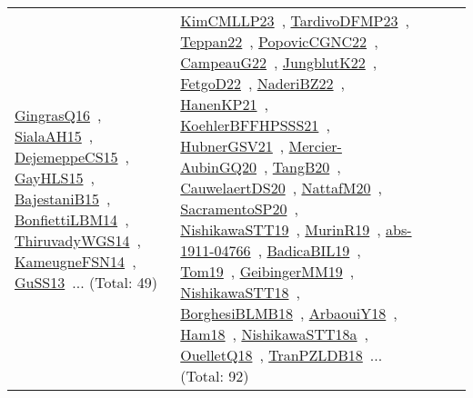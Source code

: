 {\begin{longtable}{lp{3cm}>{\raggedright\arraybackslash}p{6cm}>{\raggedright\arraybackslash}p{6cm}>{\raggedright\arraybackslash}p{8cm}}
\href{works/GingrasQ16.pdf}{GingrasQ16}~\cite{GingrasQ16}, \href{works/SialaAH15.pdf}{SialaAH15}~\cite{SialaAH15}, \href{works/DejemeppeCS15.pdf}{DejemeppeCS15}~\cite{DejemeppeCS15}, \href{works/GayHLS15.pdf}{GayHLS15}~\cite{GayHLS15}, \href{works/BajestaniB15.pdf}{BajestaniB15}~\cite{BajestaniB15}, \href{works/BonfiettiLBM14.pdf}{BonfiettiLBM14}~\cite{BonfiettiLBM14}, \href{works/ThiruvadyWGS14.pdf}{ThiruvadyWGS14}~\cite{ThiruvadyWGS14}, \href{works/KameugneFSN14.pdf}{KameugneFSN14}~\cite{KameugneFSN14}, \href{works/GuSS13.pdf}{GuSS13}~\cite{GuSS13}... (Total: 49) & \href{works/KimCMLLP23.pdf}{KimCMLLP23}~\cite{KimCMLLP23}, \href{works/TardivoDFMP23.pdf}{TardivoDFMP23}~\cite{TardivoDFMP23}, \href{works/Teppan22.pdf}{Teppan22}~\cite{Teppan22}, \href{works/PopovicCGNC22.pdf}{PopovicCGNC22}~\cite{PopovicCGNC22}, \href{works/CampeauG22.pdf}{CampeauG22}~\cite{CampeauG22}, \href{works/JungblutK22.pdf}{JungblutK22}~\cite{JungblutK22}, \href{works/FetgoD22.pdf}{FetgoD22}~\cite{FetgoD22}, \href{works/NaderiBZ22.pdf}{NaderiBZ22}~\cite{NaderiBZ22}, \href{works/HanenKP21.pdf}{HanenKP21}~\cite{HanenKP21}, \href{works/KoehlerBFFHPSSS21.pdf}{KoehlerBFFHPSSS21}~\cite{KoehlerBFFHPSSS21}, \href{works/HubnerGSV21.pdf}{HubnerGSV21}~\cite{HubnerGSV21}, \href{works/Mercier-AubinGQ20.pdf}{Mercier-AubinGQ20}~\cite{Mercier-AubinGQ20}, \href{works/TangB20.pdf}{TangB20}~\cite{TangB20}, \href{works/CauwelaertDS20.pdf}{CauwelaertDS20}~\cite{CauwelaertDS20}, \href{works/NattafM20.pdf}{NattafM20}~\cite{NattafM20}, \href{works/SacramentoSP20.pdf}{SacramentoSP20}~\cite{SacramentoSP20}, \href{works/NishikawaSTT19.pdf}{NishikawaSTT19}~\cite{NishikawaSTT19}, \href{works/MurinR19.pdf}{MurinR19}~\cite{MurinR19}, \href{works/abs-1911-04766.pdf}{abs-1911-04766}~\cite{abs-1911-04766}, \href{works/BadicaBIL19.pdf}{BadicaBIL19}~\cite{BadicaBIL19}, \href{works/Tom19.pdf}{Tom19}~\cite{Tom19}, \href{works/GeibingerMM19.pdf}{GeibingerMM19}~\cite{GeibingerMM19}, \href{works/NishikawaSTT18.pdf}{NishikawaSTT18}~\cite{NishikawaSTT18}, \href{works/BorghesiBLMB18.pdf}{BorghesiBLMB18}~\cite{BorghesiBLMB18}, \href{works/ArbaouiY18.pdf}{ArbaouiY18}~\cite{ArbaouiY18}, \href{works/Ham18.pdf}{Ham18}~\cite{Ham18}, \href{works/NishikawaSTT18a.pdf}{NishikawaSTT18a}~\cite{NishikawaSTT18a}, \href{works/OuelletQ18.pdf}{OuelletQ18}~\cite{OuelletQ18}, \href{works/TranPZLDB18.pdf}{TranPZLDB18}~\cite{TranPZLDB18}... (Total: 92)\\

\end{longtable}}
